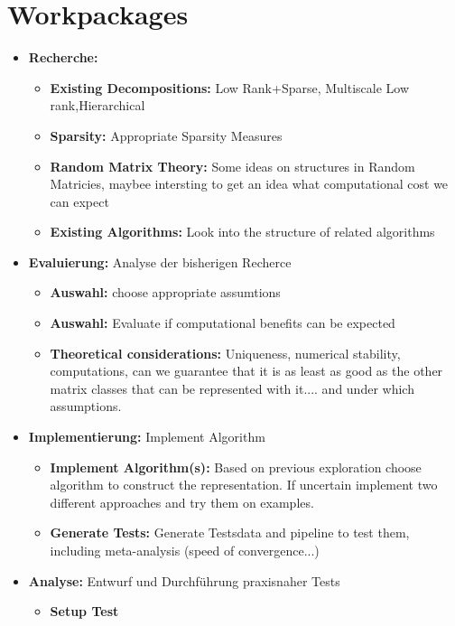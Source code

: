 \documentclass[lang=ngerman,inputenc=utf8,fontsize=10pt]{ldvarticle}
\begin{document}
\section{Workpackages}

\begin{itemize}
	\item \textbf{Recherche:}	
	\begin{itemize}
			\item \textbf{Existing Decompositions:} Low Rank+Sparse, Multiscale Low rank,Hierarchical \cite{chandrasekaran_sparse_2009,ong_beyond_2016}
			\item \textbf{Sparsity:} Appropriate Sparsity Measures \cite{ulfarsson_sparse_2015,parekh_improved_2017}
			\item \textbf{Random Matrix Theory:} Some ideas on structures in Random Matricies, maybee intersting to get an idea what computational cost we can expect
			\item \textbf{Existing Algorithms:} Look into the structure of related algorithms
		\end{itemize}
	\item \textbf{Evaluierung:} Analyse der bisherigen Recherce
		\begin{itemize}
			\item \textbf{Auswahl:} choose appropriate assumtions
			\item \textbf{Auswahl:} Evaluate if computational benefits can be expected
			\item \textbf{Theoretical considerations:} Uniqueness, numerical stability, computations, can we guarantee that it is as least as good as the other matrix classes that can be represented with it.... and under which assumptions.
		\end{itemize}
	\item \textbf{Implementierung:} Implement Algorithm
		\begin{itemize}
			\item \textbf{Implement Algorithm(s):} Based on previous exploration choose algorithm to construct the representation. If uncertain implement two different approaches and try them on examples.
			\item \textbf{Generate Tests:} Generate Testsdata and pipeline to test them, including meta-analysis (speed of convergence...)
		\end{itemize}
	\item \textbf{Analyse:} Entwurf und Durchführung praxisnaher Tests
		\begin{itemize}
			\item \textbf{Setup Test}

\end{itemize}
\end{itemize}
\end{document}
